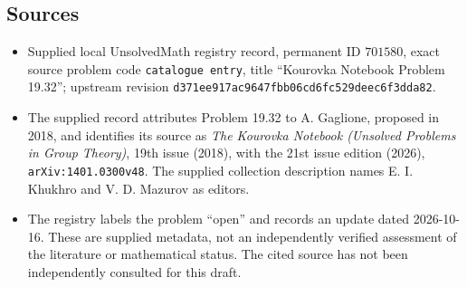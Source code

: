 \documentclass[11pt]{article}
\begin{document}
\subsection{Sources}
\begin{itemize}
\item Supplied local UnsolvedMath registry record, permanent ID \(701580\), exact source problem code \texttt{catalogue entry}, title ``Kourovka Notebook Problem 19.32''; upstream revision \texttt{d371ee917ac9647fbb06cd6fc529deec6f3dda82}.
\item The supplied record attributes Problem 19.32 to A. Gaglione, proposed in 2018, and identifies its source as \emph{The Kourovka Notebook (Unsolved Problems in Group Theory)}, 19th issue (2018), with the 21st issue edition (2026), \texttt{arXiv:1401.0300v48}. The supplied collection description names E. I. Khukhro and V. D. Mazurov as editors.
\item The registry labels the problem ``open'' and records an update dated 2026-10-16. These are supplied metadata, not an independently verified assessment of the literature or mathematical status. The cited source has not been independently consulted for this draft.
\end{itemize}
\end{document}
